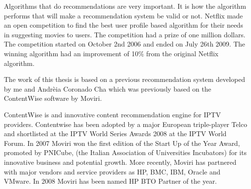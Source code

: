 Algorithms that do recommendations are very important. It is how the algorithm performs that will make a recommendation system be valid or not. Netflix made an open competition \cite{netflixprize} to find the best user profile based algorithm for their needs in suggesting movies to users. The competition had a prize of one million dollars. The competition started on October 2nd 2006 and ended on July 26th 2009. The winning algorithm had an improvement of 10\% from the original Netflix algorithm. 

The work of this thesis is based on a previous recommendation system developed by me and Andrèia Coronado Cha which was previously based on the ContentWise \cite{ContentWise} software by Moviri. 

ContentWise is and innovative content recommendation engine for IPTV providers. Contentwise has been adopted by a major European triple-player Telco and shortlisted at the IPTV World Series Awards 2008 at the IPTV World Forum.
In 2007 Moviri won the first edition of the Start Up of the Year Award, promoted by PNICube, (the Italian Association of Universities Incubators) for its innovative business and potential growth. More recently, Moviri has partnered with major vendors and service providers as HP, BMC, IBM, Oracle and VMware. In 2008 Moviri has been named HP BTO Partner of the year.     

